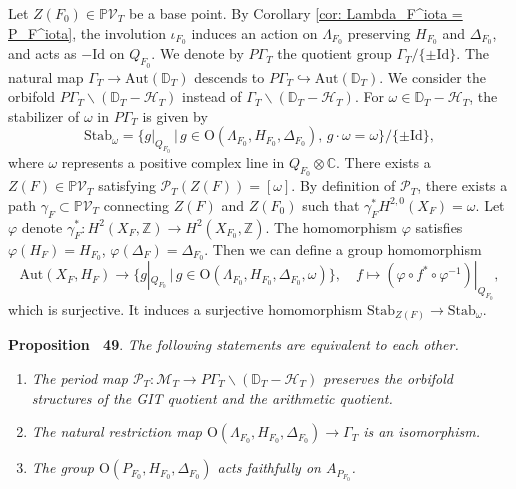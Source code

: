 \documentclass[
]{article}
\begin{document}
Let \(Z(F_0)\in\mathbb{P}\mathcal{V}_T\) be a base point. By Corollary
\ref{cor: Lambda_F^iota = P_F^iota}, the involution \(\iota_{F_0}\)
induces an action on \(\Lambda_{F_0}\) preserving \(H_{F_0}\) and
\(\Delta_{F_0}\), and acts as \(-\mathrm{Id}\) on \(Q_{F_0}\). We denote
by \(P\Gamma_T\) the quotient group \(\Gamma_T/\{\pm \mathrm{Id}\}\).
The natural map \(\Gamma_T \to \mathrm{Aut}(\mathbb{D}_T)\) descends to
\(P\Gamma_T \hookrightarrow \mathrm{Aut}(\mathbb{D}_T)\). We consider
the orbifold \(P\Gamma_T\backslash(\mathbb{D}_T-\mathcal{H}_T)\) instead
of \(\Gamma_T\backslash(\mathbb{D}_T-\mathcal{H}_T)\). For
\(\omega\in \mathbb{D}_T-\mathcal{H}_T\), the stabilizer of \(\omega\)
in \(P\Gamma_T\) is given by
\[\mathrm{Stab}_\omega = \{ g|_{Q_{F_0}} \,\big|\, g\in \mathrm{O}(\Lambda_{F_0},H_{F_0},\Delta_{F_0}),\, g\cdot\omega=\omega \}/\{\pm \mathrm{Id}\},\]
where \(\omega\) represents a positive complex line in
\(Q_{F_0}\otimes\mathbb{C}\). There exists a
\(Z(F)\in \mathbb{P}\mathcal{V}_T\) satisfying
\(\mathscr{P}_T(Z(F))=[\omega]\). By definition of \(\mathscr{P}_T\),
there exists a path \(\gamma_F\subset\mathbb{P}\mathcal{V}_T\)
connecting \(Z(F)\) and \(Z(F_0)\) such that
\(\gamma_F^*H^{2,0}(X_F)=\omega\). Let \(\varphi\) denote
\(\gamma_F^*\colon H^2(X_F,\mathbb{Z})\to H^2(X_{F_0},\mathbb{Z})\). The
homomorphism \(\varphi\) satisfies \(\varphi(H_F)=H_{F_0}\),
\(\varphi(\Delta_F)=\Delta_{F_0}\). Then we can define a group
homomorphism
\[\mathrm{Aut}(X_F,H_F) \to \{ g|_{Q_{F_0}} \,\big|\, g\in \mathrm{O}(\Lambda_{F_0},H_{F_0},\Delta_{F_0},\omega) \},\quad f \mapsto (\varphi\circ f^*\circ\varphi^{-1})|_{Q_{F_0}},\]
which is surjective. It induces a surjective homomorphism
\(\mathrm{Stab}_{Z(F)}\to\mathrm{Stab}_\omega\).

\textbf{Proposition~ 49}. \emph{\label{prop: orbifold criterion} The
following statements are equivalent to each other.}

\begin{enumerate}
\def\labelenumi{(\roman{enumi})}
\item
  \emph{The period map
  \(\mathscr{P}_T\colon \mathcal{M}_T\to P\Gamma_T\backslash(\mathbb{D}_T-\mathcal{H}_T)\)
  preserves the orbifold structures of the GIT quotient and the
  arithmetic quotient.}
\item
  \emph{The natural restriction map
  \(\mathrm{O}(\Lambda_{F_0},H_{F_0},\Delta_{F_0})\to \Gamma_T\) is an
  isomorphism.}
\item
  \emph{The group \(\mathrm{O}(P_{F_0},H_{F_0},\Delta_{F_0})\) acts
  faithfully on \(A_{P_{F_0}}\).}
\end{enumerate}
\end{document}
